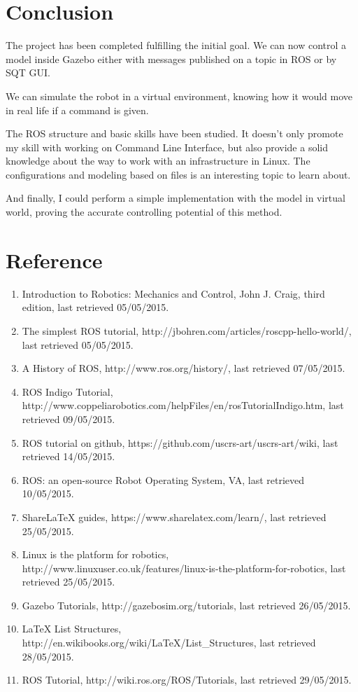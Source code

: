 \documentclass[pdftex,12pt,a4paper]{article}
\begin{document}
  \newpage
  \section{Conclusion}
  The project has been completed fulfilling the initial goal. We can now control a model inside Gazebo either with messages published on a topic in ROS or by SQT GUI.\par
  We can simulate the robot in a virtual environment, knowing how it would move in real life if a command is given.\par
  The ROS structure and basic skills have been studied. It doesn't only promote my skill with working on Command Line Interface, but also provide a solid knowledge about the way to work with an infrastructure in Linux. The configurations and modeling based on files is an interesting topic to learn about.\par
  And finally, I could perform a simple implementation with the model in virtual world, proving the accurate controlling potential of this method.
  
  \newpage
  \section{Reference}
  \begin{enumerate}
  \item Introduction to Robotics: Mechanics and Control, John J. Craig, third edition, last retrieved 05/05/2015.
  \item The simplest ROS tutorial, http://jbohren.com/articles/roscpp-hello-world/, last retrieved 05/05/2015.
  \item A History of ROS, http://www.ros.org/history/, last retrieved 07/05/2015.
  \item ROS Indigo Tutorial, http://www.coppeliarobotics.com/helpFiles/en/rosTutorialIndigo.htm, last retrieved 09/05/2015.
  \item ROS tutorial on github, https://github.com/uscrs-art/uscrs-art/wiki, last retrieved 14/05/2015.
  \item ROS: an open-source Robot Operating System, VA, last retrieved 10/05/2015.
  \item ShareLaTeX guides, https://www.sharelatex.com/learn/, last retrieved 25/05/2015.\
  \item Linux is the platform for robotics, http://www.linuxuser.co.uk/features/linux-is-the-platform-for-robotics, last retrieved 25/05/2015.
  \item Gazebo Tutorials, http://gazebosim.org/tutorials, last retrieved 26/05/2015.
  \item LaTeX List Structures, http://en.wikibooks.org/wiki/LaTeX/List\_Structures, last retrieved 28/05/2015.
  \item ROS Tutorial, http://wiki.ros.org/ROS/Tutorials, last retrieved 29/05/2015.
  \end{enumerate}
  
\end{document}
